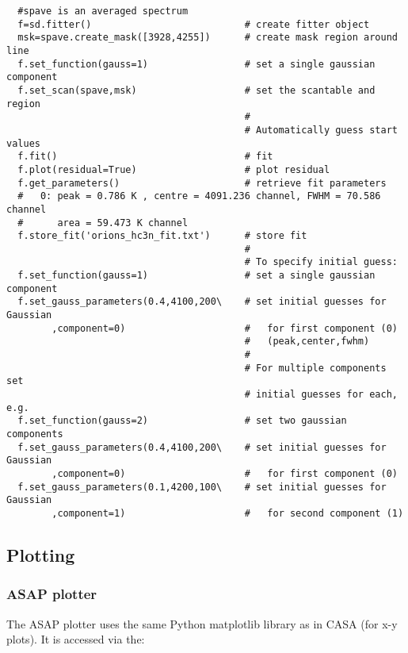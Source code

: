 \small
\begin{verbatim}
  #spave is an averaged spectrum
  f=sd.fitter()                           # create fitter object
  msk=spave.create_mask([3928,4255])      # create mask region around line
  f.set_function(gauss=1)                 # set a single gaussian component
  f.set_scan(spave,msk)                   # set the scantable and region
                                          # 
                                          # Automatically guess start values
  f.fit()                                 # fit 
  f.plot(residual=True)                   # plot residual
  f.get_parameters()                      # retrieve fit parameters
  #   0: peak = 0.786 K , centre = 4091.236 channel, FWHM = 70.586 channel
  #      area = 59.473 K channel
  f.store_fit('orions_hc3n_fit.txt')      # store fit
                                          #
                                          # To specify initial guess:
  f.set_function(gauss=1)                 # set a single gaussian component
  f.set_gauss_parameters(0.4,4100,200\    # set initial guesses for Gaussian
        ,component=0)                     #   for first component (0)
                                          #   (peak,center,fwhm)
                                          #
                                          # For multiple components set
                                          # initial guesses for each, e.g.
  f.set_function(gauss=2)                 # set two gaussian components
  f.set_gauss_parameters(0.4,4100,200\    # set initial guesses for Gaussian
        ,component=0)                     #   for first component (0)
  f.set_gauss_parameters(0.1,4200,100\    # set initial guesses for Gaussian
        ,component=1)                     #   for second component (1)

\end{verbatim}
\normalsize

\subsection{Plotting}
\label{subsection:sd.asap.plotting}

\subsubsection{ASAP plotter}
The ASAP plotter uses the same Python matplotlib library as in CASA
(for x-y plots). It is accessed via the: 

